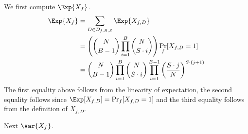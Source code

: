 We first compute $\Exp{X_f}$. 
\begin{align*}
    \Exp{X_f}&=\sum_{D\in \mathcal{D}_{f,B,S}}\Exp{X_{f,D}}\\
    &=\left(\binom{N}{B-1}\prod_{i=1}^B \binom{N}{S\cdot i}\right) \Pr_{f}[X_{f,D}=1]\\
    &=\binom{N}{B-1}\prod_{i=1}^B \binom{N}{S\cdot i} \prod_{i=1}^{B-1} \left(\frac{S\cdot j}{N}\right)^{S\cdot(j+1)}
\end{align*}
The first equality above follows from the linearity of expectation, the second equality follows since $\Exp[X_{f,D}]=\Pr_{f}[X_{f,D}=1]$ and the third equality follows from the definition of $X_{f,D}$.

Next $\Var{X_f}$. 




